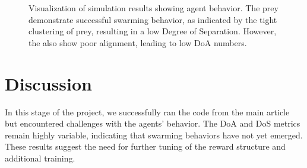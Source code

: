 \documentclass[9pt]{pnas-new}
\begin{document}
\begin{figure}[ht]
\begin{subfigure}{0.30\textwidth}
		\vspace{0.5em}
	\end{subfigure}
	\hfill
	\begin{subfigure}{0.30\textwidth}
		\centering
		\vspace{0.5em}
	\end{subfigure}
	
	\caption{Visualization of simulation results showing agent behavior. The prey demonstrate successful swarming behavior, as indicated by the tight clustering of prey, resulting in a low Degree of Separation. However, the also show poor alignment, leading to low DoA numbers.}
	\label{fig:three_images2}
\end{figure}


\section*{Discussion}
In this stage of the project, we successfully ran the code from the main article but encountered challenges with the agents' behavior. 
The DoA and DoS metrics remain highly variable, indicating that swarming behaviors have not yet emerged. 
These results suggest the need for further tuning of the reward structure and additional training.
\end{document}
